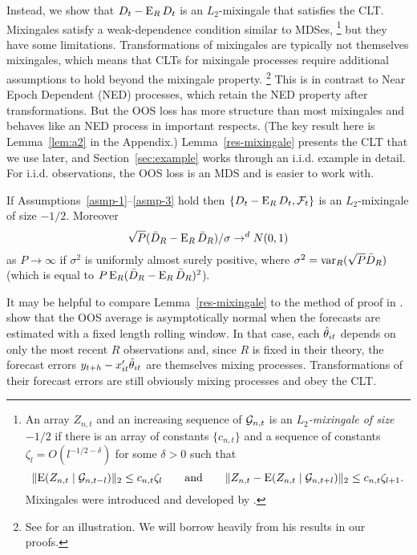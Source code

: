 \documentclass[12pt]{article}
\begin{document}
Instead, we show that $D_t - \operatorname{E}_R D_t$ is an $L_2$-mixingale that
satisfies the CLT. Mixingales satisfy a weak-dependence condition
similar to MDSes,%
\footnote{An array $Z_{n,t}$ and an increasing sequence of \sfields
  $\mathcal{G}_{n,t}$ is an \emph{$L_2$-mixingale of size $-1/2$} if there is
  an array of constants $\{c_{n,t}\}$ and a sequence of constants
  $\zeta_l = O(l^{-1/2 - \delta})$ for some $\delta > 0$ such that
  \begin{equation*}
    \lVert \operatorname{E}(Z_{n,t} \mid \mathcal{G}_{n,t-l}) \rVert_2
    \leq c_{n,t} \zeta_l
    \qquad\text{and}\qquad
    \lVert Z_{n,t} - \operatorname{E}(Z_{n,t} \mid \mathcal{G}_{n,t+l}) \rVert_2
    \leq c_{n,t} \zeta_{l+1}.
  \end{equation*}
  Mixingales were introduced and developed by
  \citet{Mcl:74,Mcl:75,Mcl:75b,Mcl:77}.} %
but they have some limitations. Transformations of mixingales are
typically not themselves mixingales, which means that CLTs for
mixingale processes require additional assumptions to hold beyond the
mixingale property.%
\footnote{See \citet{Jon:97} for an illustration. We will borrow
  heavily from his results in our proofs.} %
This is in contrast to Near Epoch Dependent (NED) processes, which
retain the NED property after transformations. \citep[See chapter 17
of][for further discussion of these properties.]{Dav:94} But the OOS
loss has more structure than most mixingales and behaves like an NED
process in important respects. (The key result here is
Lemma~\ref{lem:a2} in the Appendix.) Lemma~\ref{res-mixingale} presents the
CLT that we use later, and Section~\ref{sec:example} works through an
i.i.d. example in detail. For i.i.d. observations, the OOS loss is an
MDS and is easier to work with.

\begin{lem}\label{res-mixingale}
  If Assumptions~\ref{asmp-1}--\ref{asmp-3} hold then $\{D_t - \operatorname{E}_R
  D_t, \mathcal F_t\}$ is an $L_2$-mixingale of size $-1/2$.
  Moreover
  \begin{equation}
    \sqrt{P}(\bar{D}_{R} - \operatorname{E}_R \bar{D}_{R})/\sigma \to^d N(0,1)
  \end{equation}
  as $P \to \infty$ if $\sigma^2$ is uniformly almost surely positive,
  where $\sigma^2 = \operatorname{var}_R(\sqrt{P} \bar{D}_{R})$ (which is equal to $P
  \operatorname{E}_R(\bar{D}_R - \operatorname{E}_R \bar{D}_R)^2$).
\end{lem}

It may be helpful to compare Lemma~\ref{res-mixingale} to the method
of proof in \citet{GiW:06}. \citet{GiW:06} show that the OOS average
is asymptotically normal when the forecasts are estimated with a fixed
length rolling window. In that case, each $\hat\theta_{it}$ depends on only
the most recent $R$ observations and, since $R$ is fixed in their
theory, the forecast errors $y_{t+h} - x_{it}'\hat\theta_{it}$ are themselves
mixing processes. Transformations of their forecast errors are
still obviously mixing processes and obey the CLT.
\end{document}
